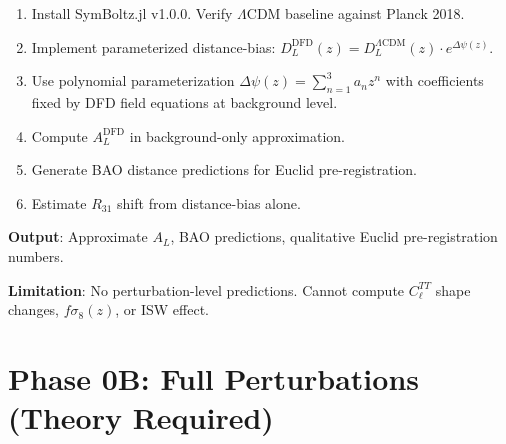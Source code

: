 \documentclass[11pt,a4paper]{article}
\begin{document}
\begin{tcolorbox}[colback=green!5!white, colframe=green!60!black,
  title={Phase 0A: 12-Hour Background-Only Computation}]
\begin{enumerate}
\item Install SymBoltz.jl v1.0.0. Verify $\Lambda$CDM baseline against Planck 2018.
\item Implement parameterized distance-bias: $D_L^{\text{DFD}}(z) = D_L^{\Lambda\text{CDM}}(z) \cdot e^{\Delta\psi(z)}$.
\item Use polynomial parameterization $\Delta\psi(z) = \sum_{n=1}^{3} a_n z^n$ with coefficients fixed by DFD field equations at background level.
\item Compute $A_L^{\text{DFD}}$ in background-only approximation.
\item Generate BAO distance predictions for Euclid pre-registration.
\item Estimate $R_{31}$ shift from distance-bias alone.
\end{enumerate}

\textbf{Output}: Approximate $A_L$, BAO predictions, qualitative Euclid pre-registration numbers.

\textbf{Limitation}: No perturbation-level predictions. Cannot compute $C_\ell^{TT}$ shape changes, $f\sigma_8(z)$, or ISW effect.
\end{tcolorbox}

\section{Phase 0B: Full Perturbations (Theory Required)}
\end{document}
